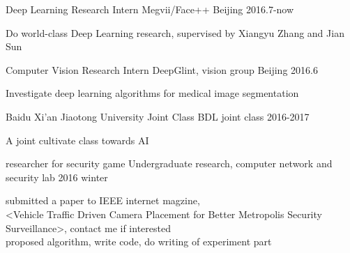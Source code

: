 

\begin{cventries}
	\cventry
	{Deep Learning Research Intern} %
	{Megvii/Face++} %
	{Beijing} %
	{2016.7-now} %
	{
		\begin{cvitems} %
			\item {Do world-class Deep Learning research, supervised by Xiangyu Zhang and Jian Sun}
		\end{cvitems}
	}
	
  \cventry
    {Computer Vision Research Intern} %
    {DeepGlint, vision group} %
    {Beijing} %
    {2016.6} %
    {
      \begin{cvitems} %
        \item {Investigate deep learning algorithms for medical image segmentation}
      \end{cvitems}
    }
    
  \cventry
    { } %
    {Baidu Xi'an Jiaotong University Joint Class} %
    {BDL joint class} %
    {2016-2017} %
    {
      \begin{cvitems} %
        \item {A joint cultivate class towards AI}
      \end{cvitems}
    }
    
  \cventry
    {researcher for security game} %
    {Undergraduate research, computer network and security lab} %
    { } %
    {2016 winter} %
    {
      \begin{cvitems} %
        \item {submitted a paper to IEEE internet magzine,\\
        <Vehicle Traffic Driven Camera Placement for Better Metropolis Security Surveillance>, contact me if interested\\
        proposed algorithm, write code, do writing of experiment part}
      \end{cvitems}
    }


\end{cventries}
